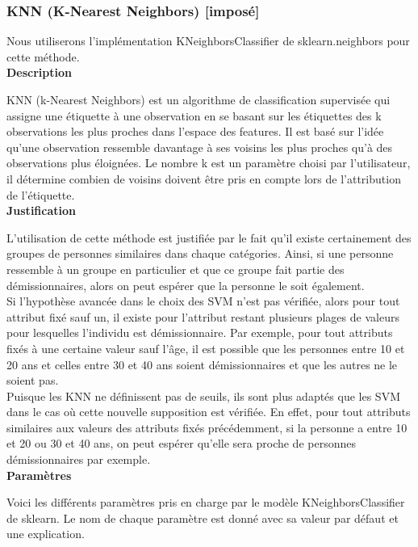 \documentclass{ceri/sty/rapport}
\begin{document}
\subsubsection{KNN (K-Nearest Neighbors) [imposé]}

Nous utiliserons l'implémentation KNeighborsClassifier de sklearn.neighbors pour cette méthode.\\

\textbf{Description}

KNN (k-Nearest Neighbors) est un algorithme de classification supervisée qui assigne une étiquette à une observation en se basant sur les étiquettes des k observations les plus proches dans l'espace des features. Il est basé sur l'idée qu'une observation ressemble davantage à ses voisins les plus proches qu'à des observations plus éloignées. Le nombre k est un paramètre choisi par l'utilisateur, il détermine combien de voisins doivent être pris en compte lors de l'attribution de l'étiquette.\\

\textbf{Justification}

L'utilisation de cette méthode est justifiée par le fait qu'il existe certainement des groupes de personnes similaires dans chaque catégories. Ainsi, si une personne ressemble à un groupe en particulier et que ce groupe fait partie des démissionnaires, alors on peut espérer que la personne le soit également.\\
Si l'hypothèse avancée dans le choix des SVM n'est pas vérifiée, alors pour tout attribut fixé sauf un, il existe pour l'attribut restant plusieurs plages de valeurs pour lesquelles l'individu est démissionnaire. Par exemple, pour tout attributs fixés à une certaine valeur sauf l'âge, il est possible que les personnes entre 10 et 20 ans et celles entre 30 et 40 ans soient démissionnaires et que les autres ne le soient pas.\\
Puisque les KNN ne définissent pas de seuils, ils sont plus adaptés que les SVM dans le cas où cette nouvelle supposition est vérifiée. En effet, pour tout attributs similaires aux valeurs des attributs fixés précédemment, si la personne a entre 10 et 20 ou 30 et 40 ans, on peut espérer qu'elle sera proche de personnes démissionnaires par exemple.\\

\textbf{Paramètres}

Voici les différents paramètres pris en charge par le modèle KNeighborsClassifier de sklearn. Le nom de chaque paramètre est donné avec sa valeur par défaut et une explication.\\
\end{document}
